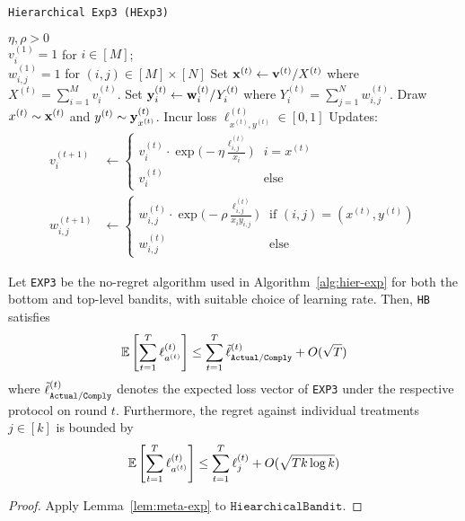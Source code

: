 \begin{algorithm}[tb]
   \caption{\texttt{Hierarchical Exp3 (HExp3)}}
   \label{alg:meta-exp2}
   \begin{algorithmic}   
    $\eta,\rho>0$\\
   	 $v^{(1)}_{i}=1$ for $i\in[M]$;\\ 
   	 $w^{(1)}_{i,j}=1$ for $(i,j)\in[M]\times[N]$
	\STATE Set ${\mathbf x}^{(t)} \leftarrow {\mathbf v}^{(t)}/X^{(t)}$ where $X^{(t)} = \sum_{i=1}^M v^{(t)}_{i}$.
	\STATE Set ${\mathbf y}^{(t)}_{i} \leftarrow {\mathbf w}^{(t)}_{i}/Y^{(t)}_{i}$ where $Y^{(t)}_{i} = \sum_{j=1}^N w^{(t)}_{i,j}$.
	\STATE Draw $x^{(t)}\sim {\mathbf x}^{(t)}$ and $y^{(t)}\sim {\mathbf y}^{(t)}_{x^{(t)}}$.
	\STATE Incur loss $\ell^{(t)}_{x^{(t)},y^{(t)}}\in [0,1]$ 
	\STATE Updates:
	\begin{align}
		v^{(t+1)}_i & \leftarrow \begin{cases}
			v^{(t)}_{i}\cdot 
			\exp\big(-\eta\frac{\ell^{(t)}_{i,j}}{x_i}\big) & i=x^{(t)} \\
			v^{(t)}_{i} & \text{else}
		\end{cases}		 
		\\
		w^{(t+1)}_{i,j} & \leftarrow \begin{cases}
			w^{(t)}_{i,j}\cdot \exp\big(-\rho\frac{\ell^{(t)}_{i,j}}{x_iy_{i,j}}\big) 
			& \text{if }(i,j)=(x^{(t)}, y^{(t)}) \\
			w^{(t)}_{i,j} &\text{else}
		\end{cases}
	\end{align}
   	\ENDFOR
   	\end{algorithmic}
\end{algorithm}


\begin{thm}\label{thm:cexp}\eod
	Let \texttt{EXP3} be the no-regret algorithm used in Algorithm~\ref{alg:hier-exp} for both the bottom and top-level bandits, with suitable choice of learning rate. Then, \texttt{HB} satisfies
	\begin{equation}
		\operatorname*{\mathbb E}\left[\sum_{t=1}^T\ell^{(t)}_{a^{(t)}}\right]
		\leq \sum_{t=1}^T \tilde{\ell}^{(t)}_{{\texttt{Actual}}/{\texttt{Comply}}}
		+ O(\sqrt{T})
	\end{equation}
	where $\tilde{\ell}^{(t)}_{{\texttt{Actual}}/{\texttt{Comply}}}$ denotes the expected loss vector of \texttt{EXP3} under the respective protocol on round $t$. 
	Furthermore, the regret against individual treatments $j\in[k]$ is bounded by
	\begin{equation}
		\operatorname*{\mathbb E}\left[\sum_{t=1}^{T} \ell^{(t)}_{a^{(t)}}\right]
		\leq \sum_{t=1}^T\ell^{(t)}_{j}
		+ O(\sqrt{T k\log k})
	\end{equation}
\end{thm}

\begin{proof}
	Apply Lemma~\ref{lem:meta-exp} to $\texttt{HiearchicalBandit}$.
\end{proof}




